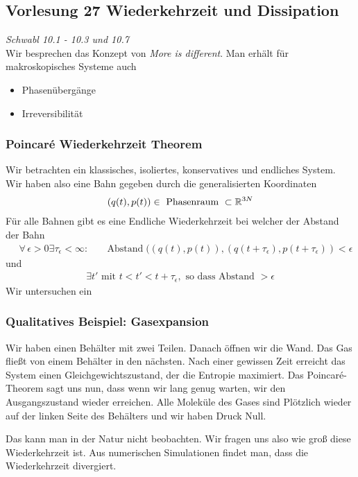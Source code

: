\subsection*{Vorlesung 27 Wiederkehrzeit und Dissipation}
\emph{Schwabl 10.1 - 10.3 und 10.7} \\
Wir besprechen das Konzept von \emph{More is different}. Man erhält für makroskopisches
Systeme auch
\begin{itemize}
  \item Phasenübergänge
  \item Irreversibilität
\end{itemize}
\subsubsection*{Poincaré Wiederkehrzeit Theorem}
Wir betrachten ein klassisches, isoliertes, konservatives und endliches
System. Wir haben also eine Bahn gegeben durch die generalisierten Koordinaten
%
\begin{align*}
  \left( q(t), p(t) \right) \in \text{ Phasenraum } \subset \mathbb{R}^{3N}
\end{align*}
%
Für alle Bahnen gibt es eine Endliche Wiederkehrzeit bei welcher der Abstand
der Bahn
%
\begin{align*}
  \quad\forall\, \epsilon > 0 \exists \tau_\epsilon < \infty: &&
  \operatorname{Abstand}((q(t), p(t)), (q(t+ \tau_\epsilon), p(t + \tau_\epsilon)) < \epsilon
\end{align*}
%
und
%
\begin{align*}
  \exists t' \text{ mit } t < t' < t+ \tau_\epsilon, \text{ so dass Abstand } > \epsilon
\end{align*}
%
Wir untersuchen ein
\subsubsection*{Qualitatives Beispiel: Gasexpansion}
Wir haben einen Behälter mit zwei Teilen. Danach öffnen wir die Wand.
Das Gas fließt von einem Behälter in den nächsten. Nach einer gewissen Zeit
erreicht das System einen Gleichgewichtszustand, der die Entropie maximiert.
Das Poincaré-Theorem sagt uns nun, dass wenn wir lang genug warten, wir den
Ausgangszustand wieder erreichen. Alle Moleküle des Gases sind Plötzlich
wieder auf der linken Seite des Behälters und wir haben Druck Null.

Das kann man in der Natur nicht beobachten. Wir fragen uns also wie groß diese
Wiederkehrzeit ist. Aus numerischen Simulationen findet man, dass die Wiederkehrzeit
divergiert. 

